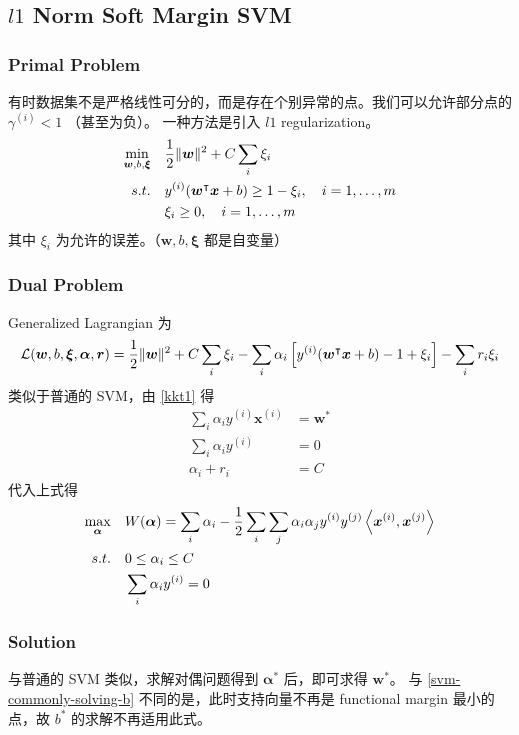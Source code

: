 \subsection{$ l1 $ Norm Soft Margin SVM}
	\subsubsection{Primal Problem}
		有时数据集不是严格线性可分的，而是存在个别异常的点。我们可以允许部分点的 $ \gamma^{(i)} < 1 $ （甚至为负）。
		一种方法是引入 $ l1 $ regularization。
		\begin{align*}
			\min_{\bm{w}, b, \bm{\xi}} \quad & \frac{1}{2} \| \bm{w} \|^2 + C \sum_i \xi_i \\
			s.t. \quad & y^{(i)} (\bm{w^}\intercal \bm{x} + b) \geq 1 - \xi_i, \quad i = 1, \ldots, m \\
			& \xi_i \geq 0, \quad i = 1, \ldots, m
		\end{align*}
		其中 $ \xi_i $ 为允许的误差。（$ \bm{w}, b, \bm{\xi} $ 都是自变量）
		
	\subsubsection{Dual Problem}
		Generalized Lagrangian 为
		\begin{equation*}
			\mathcal{L}( \bm{w}, b, \bm{\xi}, \bm{\alpha}, \bm{r} ) = \frac{1}{2} \| \bm{w} \|^2 + C \sum_i \xi_i - \sum_i \alpha_i \left[ y^{(i)} (\bm{w^}\intercal \bm{x} + b) - 1 + \xi_i \right] - \sum_i r_i \xi_i
		\end{equation*}
		类似于普通的 SVM，由 \eqref{kkt1} 得
		\begin{align}
			\sum_i \alpha_i y^{(i)} \bm{x}^{(i)} &= \bm{w}^* \label{eq:soft-margin-kkt1}\\
			\sum_i \alpha_i y^{(i)} &= 0 \label{eq:soft-margin-kkt2}\\
			\alpha_i + r_i &= C
		\end{align}
		代入上式得
		\begin{align}
			\max_{\bm{\alpha}} \quad & W(\bm{\alpha}) = \sum_i \alpha_i - \frac{1}{2} \sum_i \sum_j \alpha_i \alpha_j y^{(i)} y^{(j)} \left\langle \bm{x}^{(i)} , \bm{x}^{(j)} \right\rangle \label{eq:soft-margin-obj-function}\\
			s.t. \quad & 0 \leq \alpha_i \leq C \\
			& \sum_i \alpha_i y^{(i)} = 0
		\end{align}
		
	\subsubsection{Solution}
		与普通的 SVM 类似，求解对偶问题得到 $ \bm{\alpha}^* $ 后，即可求得 $ \bm{w}^* $。
		与 \eqref{svm-commonly-solving-b} 不同的是，此时支持向量不再是 functional margin 最小的点，故 $ b^* $ 的求解不再适用此式。
		
